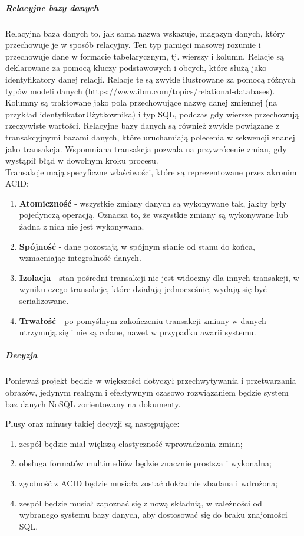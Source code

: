 \documentclass[12pt, a4paper, twoside, openany]{book}
\begin{document}
\subparagraph{Relacyjne bazy danych\\}
Relacyjna baza danych to, jak sama nazwa wskazuje, magazyn danych, który przechowuje je w sposób relacyjny.
Ten typ pamięci masowej rozumie i przechowuje dane w formacie tabelarycznym, tj. wierszy i kolumn.
Relacje są deklarowane za pomocą kluczy podstawowych i obcych, które służą jako identyfikatory danej relacji.
Relacje te są zwykle ilustrowane za pomocą różnych typów modeli danych (https://www.ibm.com/topics/relational-databases).
Kolumny są traktowane jako pola przechowujące nazwę danej zmiennej (na przykład identyfikatorUżytkownika) i typ SQL, podczas gdy wiersze przechowują rzeczywiste wartości.
Relacyjne bazy danych są również zwykle powiązane z transakcyjnymi bazami danych, które uruchamiają polecenia w sekwencji znanej jako transakcja.
Wspomniana transakcja pozwala na przywrócenie zmian, gdy wystąpił błąd w dowolnym kroku procesu.\\
Transakcje mają specyficzne właściwości, które są reprezentowane przez akronim ACID:
\begin{enumerate}[label=--]
    \item \textbf{Atomiczność} - wszystkie zmiany danych są wykonywane tak, jakby były pojedynczą operacją. Oznacza to, że wszystkie zmiany są wykonywane lub żadna z nich nie jest wykonywana.
    \item \textbf{Spójność} - dane pozostają w spójnym stanie od stanu do końca, wzmacniając integralność danych.
    \item \textbf{Izolacja} - stan pośredni transakcji nie jest widoczny dla innych transakcji, w wyniku czego transakcje, które działają jednocześnie, wydają się być serializowane.
    \item \textbf{Trwałość} - po pomyślnym zakończeniu transakcji zmiany w danych utrzymują się i nie są cofane, nawet w przypadku awarii systemu.
\end{enumerate}


\subparagraph*{Decyzja}

Ponieważ projekt będzie w większości dotyczył przechwytywania i przetwarzania obrazów, jedynym realnym i efektywnym czasowo rozwiązaniem będzie system baz danych NoSQL zorientowany na dokumenty.

Plusy oraz minusy takiej decyzji są następujące:
\begin{enumerate}[label=--]
    \item zespół będzie miał większą elastyczność wprowadzania zmian;
    \item obsługa formatów multimediów będzie znacznie prostsza i wykonalna;
    \item zgodność z ACID będzie musiała zostać dokładnie zbadana i wdrożona;
    \item zespół będzie musiał zapoznać się z nową składnią, w zależności od wybranego systemu bazy danych, aby dostosować się do braku znajomości SQL.
\end{enumerate}
\end{document}
